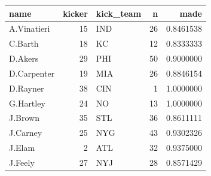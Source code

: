 \documentclass[
  11pt,
]{book}
\theoremstyle{definition}
\theoremstyle{definition}
\theoremstyle{definition}
\theoremstyle{definition}
\theoremstyle{remark}
\begin{document}
\begin{tabular}{lrlrr}
\toprule
name & kicker & kick\_team & n & made\\
\midrule
A.Vinatieri & 15 & IND & 26 & 0.8461538\\
C.Barth & 18 & KC & 12 & 0.8333333\\
D.Akers & 29 & PHI & 50 & 0.9000000\\
D.Carpenter & 19 & MIA & 26 & 0.8846154\\
D.Rayner & 38 & CIN & 1 & 1.0000000\\
\addlinespace
G.Hartley & 24 & NO & 13 & 1.0000000\\
J.Brown & 35 & STL & 36 & 0.8611111\\
J.Carney & 25 & NYG & 43 & 0.9302326\\
J.Elam & 2 & ATL & 32 & 0.9375000\\
J.Feely & 27 & NYJ & 28 & 0.8571429\\
\bottomrule
\end{tabular}

\newpage
\end{document}
